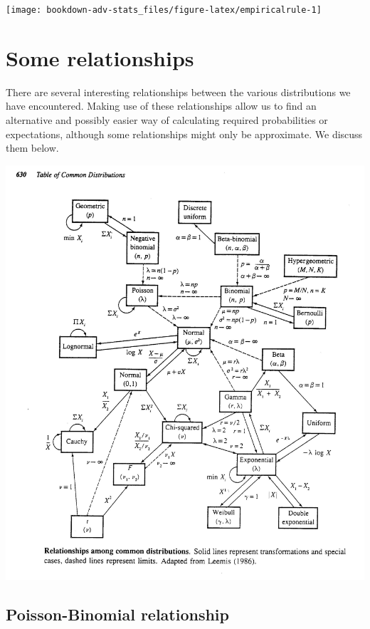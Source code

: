 \documentclass[
]{book}
\theoremstyle{definition}
\theoremstyle{definition}
\theoremstyle{definition}
\theoremstyle{definition}
\theoremstyle{remark}
\begin{document}
\begin{center}\texttt{[image: bookdown-adv-stats\_files/figure-latex/empiricalrule-1]} \end{center}

\hypertarget{some-relationships}{%
\section{Some relationships}\label{some-relationships}}

There are several interesting relationships between the various distributions we have encountered.
Making use of these relationships allow us to find an alternative and possibly easier way of calculating required probabilities or expectations, although some relationships might only be approximate.
We discuss them below.

\includegraphics{figure/distributions.jpg}

\hypertarget{poisson-binomial-relationship}{%
\subsection{Poisson-Binomial relationship}\label{poisson-binomial-relationship}}
\end{document}
